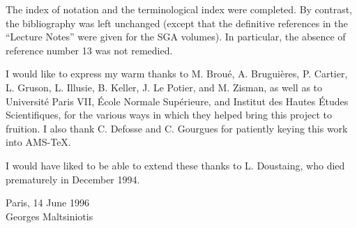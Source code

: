 The index of notation and the terminological index were completed. By contrast,
the bibliography was left unchanged (except that the definitive references in
the ``Lecture Notes'' were given for the SGA volumes). In particular, the
absence of reference number 13 was not remedied.

I would like to express my warm thanks to M. Broué, A. Bruguières, P. Cartier,
L. Gruson, L. Illusie, B. Keller, J. Le Potier, and M. Zisman, as well as to
Université Paris VII, École Normale Supérieure, and Institut des Hautes Études
Scientifiques, for the various ways in which they helped bring this project to
fruition. I also thank C. Defosse and C. Gourgues for patiently keying this work
into \textsc{AMS}-\TeX{}.

I would have liked to be able to extend these thanks to L. Doustaing, who died
prematurely in December 1994.

\begin{flushright}
Paris, 14 June 1996\\
Georges Maltsiniotis
\end{flushright}
